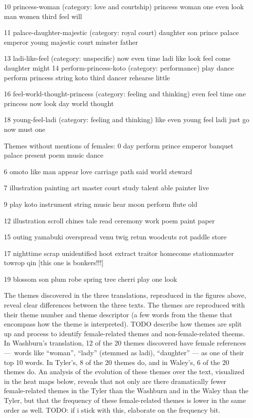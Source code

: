 \documentclass[12pt]{article}
\begin{document}
\begin{flushleft}
\begin{spacing}{2.0}
10 princess-woman (category: love and courtship)
princess woman one even look man women third feel will

11 palace-daughter-majestic (category: royal court)
daughter son prince palace emperor young majestic court minster father

13 ladi-like-feel (category: unspecific) 
now even time ladi like look feel come daughter might
14 perform-princess-koto (category: performance) 
play dance perform princess string koto third dancer rehearse little

16 feel-world-thought-princess (category: feeling and thinking) 
even feel time one princess now look day world thought

18 young-feel-ladi (category: feeling and thinking) 
like even young feel ladi just go now must one 

Themes without mentions of females: 
0 day perform prince emperor banquet palace present poem music dance 

6 omoto like man appear love carriage path said world steward

7 illustration painting art master court study talent able painter live 

9 play koto instrument string music hear moon perform flute old

12 illustration scroll chines tale read ceremony work poem paint paper

15 outing yamabuki overspread venu twig retun woodcuts rot paddle store

17 nighttime scrap unidentified hoot extract traitor homecome stationmaster towrop qin [this one is bonkers!!!]

19 blossom son plum robe spring tree cherri play one look 

The themes discovered in the three translations, reproduced in the figures above, reveal clear differences between the three texts. The themes are reproduced with their theme number and theme descriptor (a few words from the theme that encompass how the theme is interpreted). TODO describe how themes are split up and process to identify female-related themes and non-female-related theems. In Washburn’s translation, 12 of the 20 themes discovered have female references --- words like ``woman'', ``lady'' (stemmed as ladi), ``daughter'' --- as one of their top 10 words. In Tyler’s, 8 of the 20 themes do, and in Waley’s, 6 of the 20 themes do. An analysis of the evolution of these themes over the text, visualized in the heat maps below, reveals that not only are there dramatically fewer female-related themes in the Tyler than the Washburn and in the Waley than the Tyler, but that the frequency of these female-related themes is lower in the same order as well. TODO: if i stick with this, elaborate on the frequency bit.


\end{spacing}
\end{flushleft}
\end{document}
